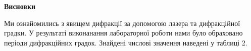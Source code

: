 \begin{center}
    \Large{\textbf{Висновки}}    
\end{center}

\vspace{1mm}

Ми ознайомились з явищем дифракції за допомогою лазера та дифракційної градки.
У результаті виконанання лабораторної роботи нами було обраховано 
періоди дифракційних градок. Знайдені числові значення наведені у таблиці 2. 
